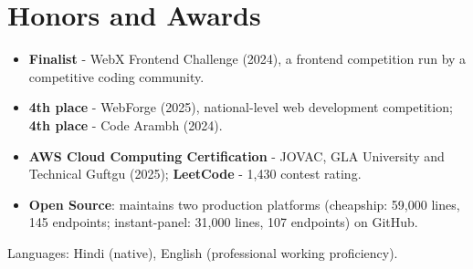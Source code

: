 \documentclass[11pt,a4paper,sans]{moderncv}
\begin{document}
\section{Honors and Awards}
\vspace{1pt}
\begin{itemize}
    \item {\textbf{Finalist} - WebX Frontend Challenge (2024), a frontend competition run by a competitive coding community.}
    \item {\textbf{4th place} - WebForge (2025), national-level web development competition; \textbf{4th place} - Code Arambh (2024).}
    \item {\textbf{AWS Cloud Computing Certification} - JOVAC, GLA University and Technical Guftgu (2025); \textbf{LeetCode} - 1,430 contest rating.}
    \item {\textbf{Open Source}: maintains two production platforms (cheapship: 59,000 lines, 145 endpoints; instant-panel: 31,000 lines, 107 endpoints) on GitHub.}
\end{itemize}


\vspace{1pt}
\small{Languages: Hindi (native), English (professional working proficiency).}
\end{document}
